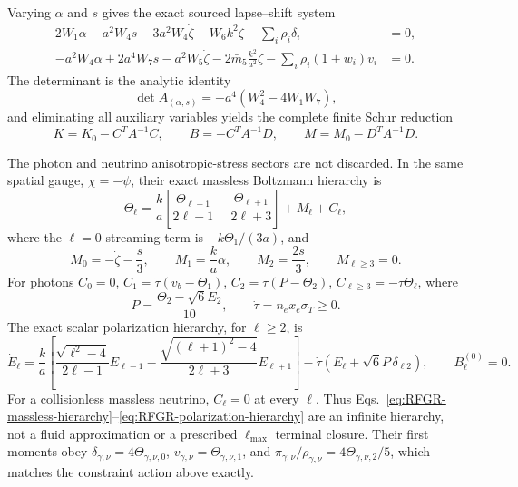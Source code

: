 \documentclass[11pt,a4paper]{article}
\begin{document}
Varying \(\alpha\) and \(s\) gives the exact sourced lapse--shift system
\begin{align}
 2W_1\alpha-a^2W_4s-3a^2W_4\dot\zeta-W_6k^2\zeta
 -\sum_i\rho_i\delta_i&=0,\nonumber\\
 -a^2W_4\alpha+2a^4W_7s-a^2W_5\dot\zeta
 -2\bar m_5\frac{k^2}{a^2}\zeta
 -\sum_i\rho_i(1+w_i)v_i&=0.
 \label{eq:RFGR-multifluid-constraints}
\end{align}
The determinant is the analytic identity
\begin{equation}
 \det A_{(\alpha,s)}=-a^4\left(W_4^2-4W_1W_7\right),
 \label{eq:RFGR-multifluid-constraint-determinant}
\end{equation}
and eliminating all auxiliary variables yields the complete finite Schur
reduction
\begin{equation}
 K=K_0-C^TA^{-1}C,\qquad
 B=-C^TA^{-1}D,\qquad
 M=M_0-D^TA^{-1}D.
 \label{eq:RFGR-multifluid-Schur}
\end{equation}

The photon and neutrino anisotropic-stress sectors are not discarded.  In the
same spatial gauge, \(\chi=-\psi\), their exact massless Boltzmann hierarchy
is \cite{HwangNoh}
\begin{equation}
 \dot\Theta_\ell=\frac{k}{a}\left[
 \frac{\Theta_{\ell-1}}{2\ell-1}
 -\frac{\Theta_{\ell+1}}{2\ell+3}\right]+M_\ell+C_\ell,
 \label{eq:RFGR-massless-hierarchy}
\end{equation}
where the \(\ell=0\) streaming term is \(-k\Theta_1/(3a)\), and
\begin{equation}
 M_0=-\dot\zeta-\frac{s}{3},\qquad
 M_1=\frac{k}{a}\alpha,\qquad M_2=\frac{2s}{3},
 \qquad M_{\ell\ge3}=0 .
 \label{eq:RFGR-hierarchy-metric-sources}
\end{equation}
For photons \(C_0=0\), \(C_1=\dot\tau(v_b-\Theta_1)\),
\(C_2=\dot\tau(P-\Theta_2)\), \(C_{\ell\ge3}=-\dot\tau\Theta_\ell\),
where
\begin{equation}
 P=\frac{\Theta_2-\sqrt6E_2}{10},\qquad
 \dot\tau=n_e x_e\sigma_T\ge0 .
 \label{eq:RFGR-Thomson}
\end{equation}
The exact scalar polarization hierarchy, for \(\ell\ge2\), is
\begin{equation}
 \dot E_\ell=\frac{k}{a}\left[
 \frac{\sqrt{\ell^2-4}}{2\ell-1}E_{\ell-1}
 -\frac{\sqrt{(\ell+1)^2-4}}{2\ell+3}E_{\ell+1}\right]
 -\dot\tau\left(E_\ell+\sqrt6P\,\delta_{\ell2}\right),
 \qquad B_\ell^{(0)}=0 .
 \label{eq:RFGR-polarization-hierarchy}
\end{equation}
For a collisionless massless neutrino, \(C_\ell=0\) at every \(\ell\).  Thus
Eqs.~\eqref{eq:RFGR-massless-hierarchy}--\eqref{eq:RFGR-polarization-hierarchy}
are an infinite hierarchy, not a fluid approximation or a prescribed
\(\ell_{\max}\) terminal closure.  Their first moments obey
\(\delta_{\gamma,\nu}=4\Theta_{\gamma,\nu,0}\),
\(v_{\gamma,\nu}=\Theta_{\gamma,\nu,1}\), and
\(\pi_{\gamma,\nu}/\rho_{\gamma,\nu}=4\Theta_{\gamma,\nu,2}/5\), which
matches the constraint action above exactly.
\end{document}
